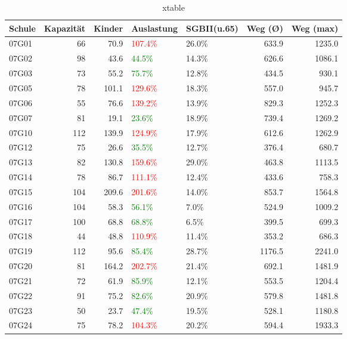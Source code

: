 \documentclass[a4paper]{article}
\begin{document}
\begin{table}[ht]
\centering
\caption{xtable} 
\begin{tabular}{lrrllrr}
  \toprule
Schule & Kapazität & Kinder & Auslastung & SGBII(u.65) & Weg (Ø) & Weg (max) \\ 
  \midrule
07G01 & 66 & 70.9 & \textcolor{red}{107.4\%} & 26.0\% & 633.9 & 1235.0 \\ 
  07G02 & 98 & 43.6 & \textcolor{green}{44.5\%} & 14.3\% & 626.6 & 1086.1 \\ 
  07G03 & 73 & 55.2 & \textcolor{green}{75.7\%} & 12.8\% & 434.5 & 930.1 \\ 
  07G05 & 78 & 101.1 & \textcolor{red}{129.6\%} & 18.3\% & 557.0 & 945.7 \\ 
  07G06 & 55 & 76.6 & \textcolor{red}{139.2\%} & 13.9\% & 829.3 & 1252.3 \\ 
  07G07 & 81 & 19.1 & \textcolor{green}{23.6\%} & 18.9\% & 739.4 & 1269.2 \\ 
  07G10 & 112 & 139.9 & \textcolor{red}{124.9\%} & 17.9\% & 612.6 & 1262.9 \\ 
  07G12 & 75 & 26.6 & \textcolor{green}{35.5\%} & 12.7\% & 376.4 & 680.7 \\ 
  07G13 & 82 & 130.8 & \textcolor{red}{159.6\%} & 29.0\% & 463.8 & 1113.5 \\ 
  07G14 & 78 & 86.7 & \textcolor{red}{111.1\%} & 12.4\% & 433.6 & 758.3 \\ 
  07G15 & 104 & 209.6 & \textcolor{red}{201.6\%} & 14.0\% & 853.7 & 1564.8 \\ 
  07G16 & 104 & 58.3 & \textcolor{green}{56.1\%} & 7.0\% & 524.9 & 1009.2 \\ 
  07G17 & 100 & 68.8 & \textcolor{green}{68.8\%} & 6.5\% & 399.5 & 699.3 \\ 
  07G18 & 44 & 48.8 & \textcolor{red}{110.9\%} & 11.4\% & 353.2 & 686.3 \\ 
  07G19 & 112 & 95.6 & \textcolor{green}{85.4\%} & 28.7\% & 1176.5 & 2241.0 \\ 
  07G20 & 81 & 164.2 & \textcolor{red}{202.7\%} & 21.4\% & 692.1 & 1481.9 \\ 
  07G21 & 72 & 61.9 & \textcolor{green}{85.9\%} & 12.1\% & 553.5 & 1204.4 \\ 
  07G22 & 91 & 75.2 & \textcolor{green}{82.6\%} & 20.9\% & 579.8 & 1481.8 \\ 
  07G23 & 50 & 23.7 & \textcolor{green}{47.4\%} & 19.5\% & 528.1 & 1180.8 \\ 
  07G24 & 75 & 78.2 & \textcolor{red}{104.3\%} & 20.2\% & 594.4 & 1933.3 \\ 

\end{tabular}
\end{table}
\end{document}
